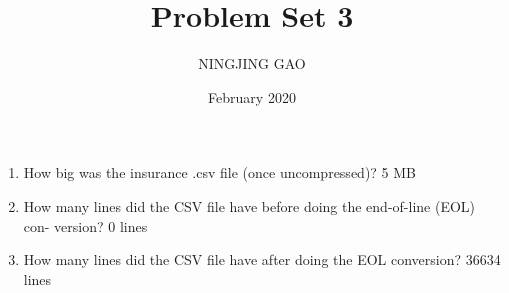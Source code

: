 \documentclass{article}
\title{Problem Set 3}
\author{NINGJING GAO}
\date{February 2020}
\begin{document}
\maketitle



\begin{enumerate}
\item  How big was the insurance .csv file (once uncompressed)? 
5 MB
\item How many lines did the CSV file have before doing the end-of-line (EOL) con- version?
 0 lines
\item  How many lines did the CSV file have after doing the EOL conversion?  36634 lines

\end{enumerate}
\end{document}
